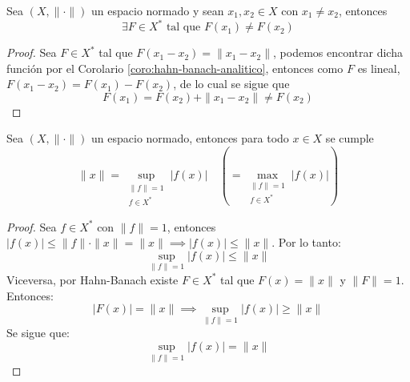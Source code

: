 \begin{coro}
    Sea $(X, \|\cdot\|)$ un espacio normado y sean $x_1, x_2 \in X$ con $x_1 \neq x_2$, entonces
    \begin{equation*}
        \exists F \in X^* \text{ tal que } F(x_1) \neq F(x_2)
    \end{equation*}

\begin{proof}
    Sea $F\in X^*$ tal que $F(x_1 - x_2) = \|x_1 - x_2\|$, podemos encontrar dicha función por el Corolario \ref{coro:hahn-banach-analitico}, entonces como $F$ es lineal, $F(x_1 - x_2) = F(x_1) - F(x_2)$, de lo cual se sigue que
    \begin{equation*}        
        F(x_1) = F(x_2) + \|x_1 - x_2\| \neq F(x_2)
    \end{equation*}
\end{proof}
\end{coro}

\begin{coro}\label{coro:hahn-banach-analitico-norma}
    Sea $(X, \|\cdot\|)$ un espacio normado, entonces para todo $x \in X$ se cumple
    \begin{equation*}
        \|x\| = \sup_{\substack{\|f\|=1 \\ f \in X^*}} |f(x)| \quad \left( = \max_{\substack{\|f\|=1 \\ f \in X^*}} |f(x)| \right)
    \end{equation*}

\begin{proof}
    Sea $f \in X^*$ con $\|f\| = 1$, entonces $|f(x)| \leq \|f\| \cdot \|x\| = \|x\| \implies |f(x)| \leq \|x\|$.
    Por lo tanto:
    \begin{equation*}
        \sup_{\|f\|=1} |f(x)| \leq \|x\|
    \end{equation*}
    Viceversa, por Hahn-Banach existe $F \in X^*$ tal que $F(x) = \|x\|$ y $\|F\| = 1$. Entonces:
    \begin{equation*}        
        |F(x)| = \|x\| \implies \sup_{\|f\|=1} |f(x)| \geq \|x\|
    \end{equation*}
    Se sigue que:
    \begin{equation*}        
        \sup_{\|f\|=1} |f(x)| = \|x\|
    \end{equation*}
\end{proof}
\end{coro}

